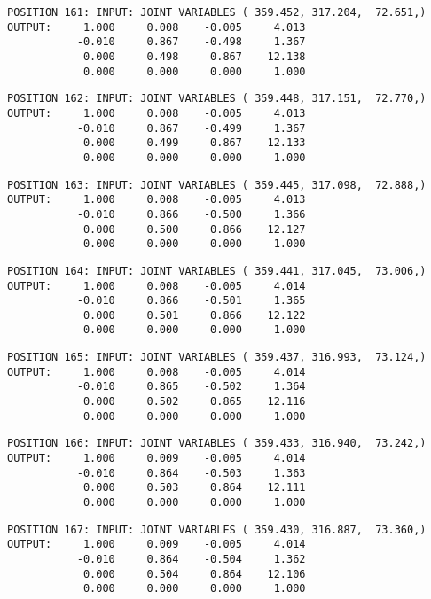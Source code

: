 \begin{verbatim}
POSITION 161: INPUT: JOINT VARIABLES ( 359.452, 317.204,  72.651,)
OUTPUT:     1.000     0.008    -0.005     4.013
           -0.010     0.867    -0.498     1.367
            0.000     0.498     0.867    12.138
            0.000     0.000     0.000     1.000
\end{verbatim} \pagebreak[1]\begin{verbatim}
POSITION 162: INPUT: JOINT VARIABLES ( 359.448, 317.151,  72.770,)
OUTPUT:     1.000     0.008    -0.005     4.013
           -0.010     0.867    -0.499     1.367
            0.000     0.499     0.867    12.133
            0.000     0.000     0.000     1.000
\end{verbatim} \pagebreak[1]\begin{verbatim}
POSITION 163: INPUT: JOINT VARIABLES ( 359.445, 317.098,  72.888,)
OUTPUT:     1.000     0.008    -0.005     4.013
           -0.010     0.866    -0.500     1.366
            0.000     0.500     0.866    12.127
            0.000     0.000     0.000     1.000
\end{verbatim} \pagebreak[1]\begin{verbatim}
POSITION 164: INPUT: JOINT VARIABLES ( 359.441, 317.045,  73.006,)
OUTPUT:     1.000     0.008    -0.005     4.014
           -0.010     0.866    -0.501     1.365
            0.000     0.501     0.866    12.122
            0.000     0.000     0.000     1.000
\end{verbatim} \pagebreak[1]\begin{verbatim}
POSITION 165: INPUT: JOINT VARIABLES ( 359.437, 316.993,  73.124,)
OUTPUT:     1.000     0.008    -0.005     4.014
           -0.010     0.865    -0.502     1.364
            0.000     0.502     0.865    12.116
            0.000     0.000     0.000     1.000
\end{verbatim} \pagebreak[1]\begin{verbatim}
POSITION 166: INPUT: JOINT VARIABLES ( 359.433, 316.940,  73.242,)
OUTPUT:     1.000     0.009    -0.005     4.014
           -0.010     0.864    -0.503     1.363
            0.000     0.503     0.864    12.111
            0.000     0.000     0.000     1.000
\end{verbatim} \pagebreak[1]\begin{verbatim}
POSITION 167: INPUT: JOINT VARIABLES ( 359.430, 316.887,  73.360,)
OUTPUT:     1.000     0.009    -0.005     4.014
           -0.010     0.864    -0.504     1.362
            0.000     0.504     0.864    12.106
            0.000     0.000     0.000     1.000
\end{verbatim} \pagebreak[1]\begin{verbatim}

\end{verbatim}
